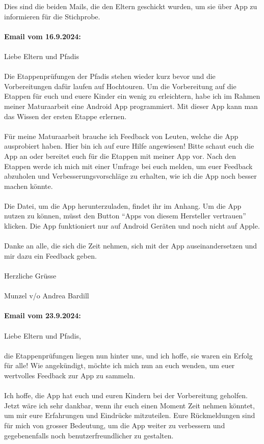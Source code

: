 Dies sind die beiden Mails, die den Eltern geschickt wurden, um sie über App zu informieren für die Stichprobe.
\\\\
\textbf{Email vom 16.9.2024:}
\\\\
Liebe Eltern und Pfadis 
\\\\
Die Etappenprüfungen der Pfadis stehen wieder kurz bevor und die Vorbereitungen dafür laufen auf Hochtouren. Um die Vorbereitung auf die Etappen für euch und euere Kinder ein wenig zu erleichtern, habe ich im Rahmen meiner Maturaarbeit eine Android App programmiert. Mit dieser App kann man das Wissen der ersten Etappe erlernen.  
\\\\
Für meine Maturaarbeit brauche ich Feedback von Leuten, welche die App ausprobiert haben. Hier bin ich auf eure Hilfe angewiesen! Bitte schaut euch die App an oder bereitet euch für die Etappen mit meiner App vor. Nach den Etappen werde ich mich mit einer Umfrage bei euch melden, um euer Feedback abzuholen und Verbesserungsvorschläge zu erhalten, wie ich die App noch besser machen könnte.  
\\\\
Die Datei, um die App herunterzuladen, findet ihr im Anhang. Um die App nutzen zu können, müsst den Button “Apps von diesem Hersteller vertrauen” klicken. Die App funktioniert nur auf Android Geräten und noch nicht auf Apple. 
\\\\
Danke an alle, die sich die Zeit nehmen, sich mit der App auseinandersetzen und mir dazu ein Feedback geben. 
\\\\
Herzliche Grüsse 
\\\\
Munzel v/o Andrea Bardill
\\\\
\textbf{Email vom 23.9.2024:}
\\\\
Liebe Eltern und Pfadis,
\\\\
die Etappenprüfungen liegen nun hinter uns, und ich hoffe, sie waren ein Erfolg für alle! Wie angekündigt, möchte ich mich nun an euch wenden, um euer wertvolles Feedback zur App zu sammeln.
\\\\
Ich hoffe, die App hat euch und euren Kindern bei der Vorbereitung geholfen. Jetzt wäre ich sehr dankbar, wenn ihr euch einen Moment Zeit nehmen könntet, um mir eure Erfahrungen und Eindrücke mitzuteilen. Eure Rückmeldungen sind für mich von grosser Bedeutung, um die App weiter zu verbessern und gegebenenfalls noch benutzerfreundlicher zu gestalten.
